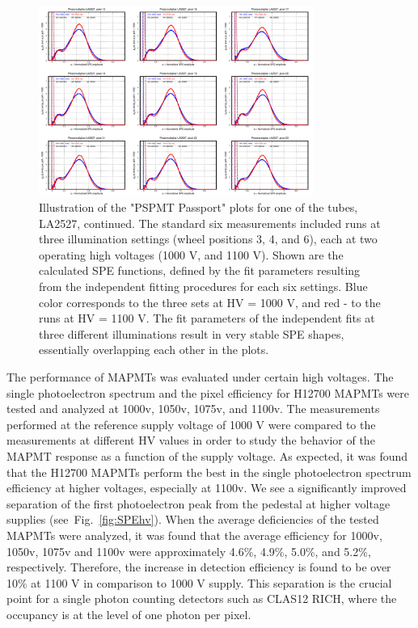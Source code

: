 \begin{figure}[p]
	\centering
	\includegraphics[width=0.8\textwidth]{figures/pavel_temp/LA2527_spectra_temp.png}
	\caption{Illustration of the "PSPMT Passport" plots for one of the tubes, LA2527, continued. The standard six measurements included runs at three illumination settings (wheel positions 3, 4, and 6), each at two operating high voltages (1000 V, and 1100 V). Shown are the calculated SPE functions, defined by the fit parameters resulting from the independent fitting procedures for each six settings. Blue color corresponds to the three sets at HV = 1000 V, and red - to the runs at HV = 1100 V. The fit parameters of the independent fits at three different illuminations result in very stable SPE shapes, essentially overlapping each other in the plots.}
	\label{fig:LA2527_passport_spectra}
\end{figure}




\iffalse
The performance of MAPMTs was evaluated under certain high voltages.
The single photoelectron spectrum and the pixel efficiency for H12700 MAPMTs were tested and analyzed at 1000v, 1050v, 1075v, and 1100v.
The measurements performed at the reference supply voltage of 1000 V were compared to the measurements at different HV values in order to study the behavior of the MAPMT response as a function of the supply voltage.
As expected, it was found that the H12700 MAPMTs perform the best in the single photoelectron spectrum efficiency at higher voltages, especially at 1100v.
We see a significantly improved separation of the first photoelectron peak from the pedestal at higher voltage supplies (see~Fig.~\ref{fig:SPEhv}).
When the average deficiencies of the tested MAPMTs were analyzed, it was found that the average efficiency for 1000v, 1050v, 1075v and 1100v were approximately 4.6\%, 4.9\%, 5.0\%, and 5.2\%, respectively.
Therefore, the increase in detection efficiency is found to be over 10\% at 1100 V in comparison to 1000 V supply.
This separation is the crucial point for a single photon counting detectors such as CLAS12 RICH, where the occupancy is at the level of one photon per pixel.




